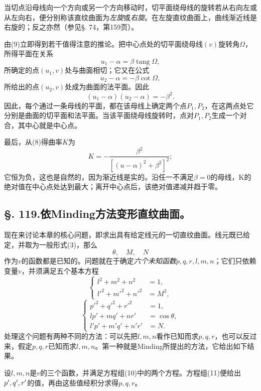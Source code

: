 当切点沿母线向一个方向或另一个方向移动时，切平面绕母线的旋转若从右向左或从左向右，便分别称该直纹曲面为\emph{左旋}或\emph{右旋}。在左旋直纹曲面上，曲线渐近线是右旋的；反之亦然（参见\S. 74，第159页）。

由(9)立即得到若干值得注意的推论。把中心点处的切平面绕母线\((v)\)旋转角\(\Omega\)，所得平面在关系
\[
 u_1-\alpha=\beta\operatorname{tang}\Omega,
\]
所确定的点\((u_1,v)\)处与曲面相切；它又在公式
\[
 u_2-\alpha=-\beta\cot\Omega,
\]
所给出的点\((u_2,v)\)处成为曲面的法平面。因此
\[
 (u_1-\alpha)(u_2-\alpha)=-\beta^2.
\]
因此，每个通过一条母线的平面，都在该母线上确定两个点\(P_1,P_2\)，在这两点处它分别是曲面的切平面和法平面。当该平面绕母线旋转时，点对\(P_1,P_2\)生成一个对合，其中心就是中心点。

最后，从(8)得曲率\(K\)为
\[
 K=-\frac{\beta^2}{\left[(u-\alpha)^2+\beta^2\right]^2};
\]
它恒为负，这也是自然的，因为渐近线是实的。沿任一不满足\(\beta=0\)的母线，K的绝对值在中心点处达到最大；离开中心点后，该绝对值递减并趋于零。

\subsection*{\S. 119.\quad 依Minding方法变形直纹曲面。}

现在来讨论本章的核心问题，即求出具有给定线元的一切直纹曲面。线元既已给定，并取为一般形式(3)，那么
\[
 \theta,
 \quad M,
 \quad N
\]
作为\(v\)的函数都是已知的。问题就在于确定\emph{六个未知函数}\(p,q,r,l,m,n\)；它们只依赖变量\(v\)，并须满足五个基本方程
\begin{equation}\tag{10}
\left\{
\begin{aligned}
 l^2+m^2+n^2&=1,\\
 l'^2+m'^2+n'^2&=M^2,
\end{aligned}
\right.
\end{equation}
\begin{equation}\tag{11}
\left\{
\begin{aligned}
 p'^2+q'^2+r'^2&=1,\\
 lp'+mq'+nr'&=\cos\theta,\\
 l'p'+m'q'+n'r'&=N.
\end{aligned}
\right.
\end{equation}
处理这个问题有两种不同的方法：可以先把\(l,m,n\)看作已知而求\(p,q,r\)，也可以反过来，假定\(p,q,r\)已知而求\(l,m,n\)。第一种就是Minding所提出的方法，它给出如下结果。

设\(l,m,n\)是\(v\)的三个函数，并满足方程组(10)中的两个方程。方程组(11)便给出\(p',q',r'\)的值，再由这些值经积分求得\(p,q,r\)。

